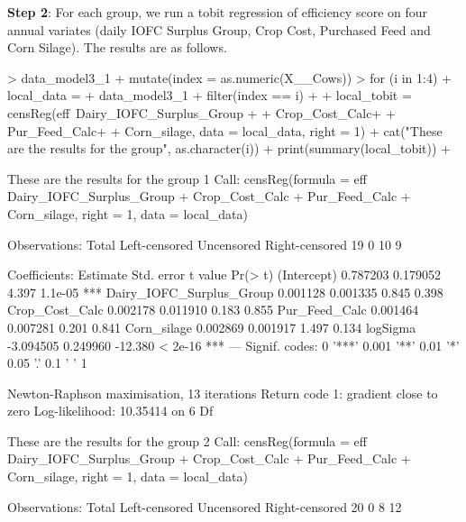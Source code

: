 \documentclass[12pt,]{article}
\begin{document}
\textbf{Step 2}: For each group, we run a tobit regression of efficiency score on four annual variates (daily IOFC Surplus Group, Crop Cost, Purchased Feed and Corn Silage). The results are as follows.
%
\begin{Schunk}
\begin{Sinput}
> data_model3_1%<>%
+   mutate(index = as.numeric(X__Cows))
> for (i in 1:4){
+   local_data = 
+     data_model3_1%>%  
+     filter(index == i)
+   
+     local_tobit = censReg(eff~Dairy_IOFC_Surplus_Group +
+                   Crop_Cost_Calc+
+                   Pur_Feed_Calc+
+                   Corn_silage, data = local_data, right =  1)
+     cat("These are the results for the group", as.character(i))
+     print(summary(local_tobit))
+   }
\end{Sinput}
\begin{Soutput}
These are the results for the group 1
Call:
censReg(formula = eff ~ Dairy_IOFC_Surplus_Group + Crop_Cost_Calc + 
    Pur_Feed_Calc + Corn_silage, right = 1, data = local_data)

Observations:
         Total  Left-censored     Uncensored Right-censored 
            19              0             10              9 

Coefficients:
                          Estimate Std. error t value Pr(> t)    
(Intercept)               0.787203   0.179052   4.397 1.1e-05 ***
Dairy_IOFC_Surplus_Group  0.001128   0.001335   0.845   0.398    
Crop_Cost_Calc            0.002178   0.011910   0.183   0.855    
Pur_Feed_Calc             0.001464   0.007281   0.201   0.841    
Corn_silage               0.002869   0.001917   1.497   0.134    
logSigma                 -3.094505   0.249960 -12.380 < 2e-16 ***
---
Signif. codes:  0 '***' 0.001 '**' 0.01 '*' 0.05 '.' 0.1 ' ' 1

Newton-Raphson maximisation, 13 iterations
Return code 1: gradient close to zero
Log-likelihood: 10.35414 on 6 Df

These are the results for the group 2
Call:
censReg(formula = eff ~ Dairy_IOFC_Surplus_Group + Crop_Cost_Calc + 
    Pur_Feed_Calc + Corn_silage, right = 1, data = local_data)

Observations:
         Total  Left-censored     Uncensored Right-censored 
            20              0              8             12 


\end{Soutput}
\end{Schunk}
\end{document}
